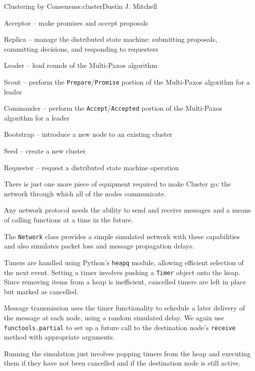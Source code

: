 \begin{aosachapter}{Clustering by Consensus}{s:cluster}{Dustin J. Mitchell}
\begin{aosaitemize}
\item
  Acceptor -- make promises and accept proposals
\item
  Replica -- manage the distributed state machine: submitting proposals,
  committing decisions, and responding to requesters
\item
  Leader -- lead rounds of the Multi-Paxos algorithm
\item
  Scout -- perform the \texttt{Prepare}/\texttt{Promise} portion of the
  Multi-Paxos algorithm for a leader
\item
  Commander -- perform the \texttt{Accept}/\texttt{Accepted} portion of
  the Multi-Paxos algorithm for a leader
\item
  Bootstrap -- introduce a new node to an existing cluster
\item
  Seed -- create a new cluster
\item
  Requester -- request a distributed state machine operation
\end{aosaitemize}

There is just one more piece of equipment required to make Cluster go:
the network through which all of the nodes communicate.

\label{network}

Any network protocol needs the ability to send and receive messages and
a means of calling functions at a time in the future.

The \texttt{Network} class provides a simple simulated network with
these capabilities and also simulates packet loss and message
propagation delays.

Timers are handled using Python's \texttt{heapq} module, allowing
efficient selection of the next event. Setting a timer involves pushing
a \texttt{Timer} object onto the heap. Since removing items from a heap
is inefficient, cancelled timers are left in place but marked as
cancelled.

Message transmission uses the timer functionality to schedule a later
delivery of the message at each node, using a random simulated delay. We
again use \texttt{functools.partial} to set up a future call to the
destination node's \texttt{receive} method with appropriate arguments.

Running the simulation just involves popping timers from the heap and
executing them if they have not been cancelled and if the destination
node is still active.

\begin{verbatim}


\end{verbatim}
\end{aosachapter}
